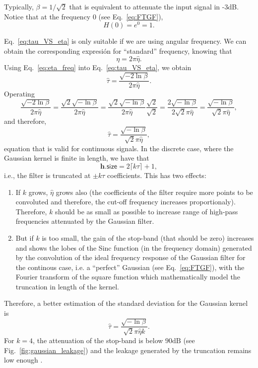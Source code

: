 \documentclass{article}
\begin{document}
Typically, $\beta=1/\sqrt{2}$ that is equivalent to attenuate the
input signal in -3dB. Notice that at the frequency 0 (see
Eq.~\ref{eq:FTGF}),
\begin{equation*}
  H(0) = e^0=1.
\end{equation*}

Eq.~\ref{eq:tau_VS_eta} is only suitable if we are using angular
frequency. We can obtain the corresponding expresión for
``standard'' frequency, knowing that
\begin{equation}
  \eta = 2\pi\hat{\eta}.
  \label{eq:eta_freq}
\end{equation}
Using Eq.~\ref{eq:eta_freq} into Eq.~\ref{eq:tau_VS_eta}, we obtain
\begin{equation}
  \hat{\tau} = \frac{\sqrt{-2\ln\beta}}{2\pi\hat{\eta}}.
  \label{eq:tau_VS_eta_standard}
\end{equation}
Operating
\begin{equation*}
  \frac{\sqrt{-2\ln\beta}}{2\pi\hat{\eta}} = \frac{\sqrt{2}\sqrt{-\ln\beta}}{2\pi\hat{\eta}} = \frac{\sqrt{2}\sqrt{-\ln\beta}}{2\pi\hat{\eta}}\frac{\sqrt{2}}{\sqrt{2}} = \frac{2\sqrt{-\ln\beta}}{2\sqrt{2}\pi\hat{\eta}} = \frac{\sqrt{-\ln\beta}}{\sqrt{2}\pi\hat{\eta}},
\end{equation*}
and therefore,
\begin{equation}
  \hat{\tau} = \frac{\sqrt{-\ln\beta}}{\sqrt{2}\pi\hat{\eta}},
  \label{eq:ideal_hat_tau}
\end{equation}
equation that is valid for continuous signals. In the discrete case,
where the Gaussian kernel is finite in length, we have that
\begin{equation}
  \mathbf{h}.\mathsf{size} = 2\lceil k\tau\rceil + 1,
\end{equation}
i.e., the filter is truncated at $\pm k\tau$ coefficients. This has
two effects:
\begin{enumerate}
\item If $k$ grows, $\hat{\eta}$ grows also (the coefficients of the
  filter require more points to be convoluted and therefore, the
  cut-off frequency increases proportionaly). Therefore, $k$ should be
  as small as possible to increase range of high-pass frequencies
  attenuated by the Gaussian filter.
\item But if $k$ is too small, the gain of the stop-band (that should
  be zero) increases and shows the lobes of the Sinc function (in the
  frequency domain) generated by the convolution of the ideal
  frequency response of the Gaussian filter for the continous case,
  i.e. a ``perfect'' Gaussian (see Eq.~\ref{eq:FTGF}), with the
  Fourier transform of the square function which mathematically model
  the truncation in length of the kernel.
\end{enumerate}
Therefore, a better estimation of the standard deviation for the
Gaussian kernel is
\begin{equation}
  \hat{\tau} = \frac{\sqrt{-\ln\beta}}{\sqrt{2}\pi\hat{\eta}k}.
  \label{eq:ideal_hat_tau}
\end{equation}
For $k=4$, the attenuation of the stop-band is below $90\text{dB}$
(see Fig.~\ref{fig:gaussian_leakage}) and the leakage generated by the
truncation remains low enough .
\end{document}
